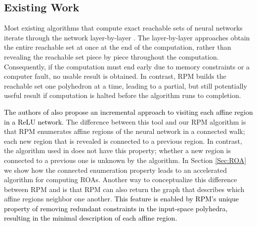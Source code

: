 
\subsection{Existing Work}
Most existing algorithms that compute exact reachable sets of neural networks iterate through the network layer-by-layer \cite{xiang2017reachable,nnv,yang2020reachability}. 
The layer-by-layer approaches obtain the entire reachable set at once at the end of the computation, rather than revealing the reachable set piece by piece throughout the computation. 
Consequently, if the computation must end early due to memory constraints or a computer fault, no usable result is obtained. 
In contrast, RPM builds the reachable set one polyhedron at a time, leading to a partial, but still potentially useful result if computation is halted before the algorithm runs to completion. 

\textcolor{black}{The authors of \cite{nnenum} also propose an incremental approach to visiting each affine region in a ReLU network.}
The difference between this tool and our RPM algorithm is that RPM enumerates affine regions of the neural network in a connected walk; each new region that is revealed is connected to a previous region. 
In contrast, the algorithm used in \cite{nnenum} does not have this property; whether a new region is connected to a previous one is unknown by the algorithm.
In Section \ref{Sec:ROA} we show how the connected enumeration property leads to an accelerated algorithm for computing ROAs.
Another way to conceptualize this difference between RPM and \cite{nnenum} is that RPM can also return the graph that describes which affine regions neighbor one another. \textcolor{black}{This feature is enabled by RPM's unique property of removing redundant constraints in the input-space polyhedra, resulting in the minimal description of each affine region.}

